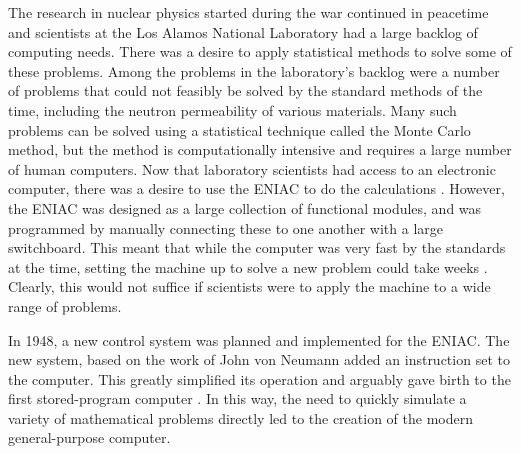 \documentclass[\rootfolder/main.tex]{subfiles}
\begin{document}
The research in nuclear physics started during the war continued in peacetime and scientists at the Los Alamos National Laboratory had a large backlog of computing needs.
There was a desire to apply statistical methods to solve some of these problems.
Among the problems in the laboratory's backlog were a number of problems that could not feasibly be solved by the standard methods of the time, including the neutron permeability of various materials.
Many such problems can be solved using a statistical technique called the Monte Carlo method, but the method is computationally intensive and requires a large number of human computers.
Now that laboratory scientists had access to an electronic computer, there was a desire to use the ENIAC to do the calculations \cite{Haigh2014}.
However, the ENIAC was designed as a large collection of functional modules, and was programmed by manually connecting these to one another with a large switchboard.
This meant that while the computer was very fast by the standards at the time, setting the machine up to solve a new problem could take weeks \cite{Rope2007}.
Clearly, this would not suffice if scientists were to apply the machine to a wide range of problems.

In 1948, a new control system was planned and implemented for the ENIAC.
The new system, based on the work of John von Neumann \cite{VonNeumann1993} \cite{Haigh2014a} added an instruction set to the computer.
This greatly simplified its operation and arguably gave birth to the first stored-program computer \cite{Rope2007}.
In this way, the need to quickly simulate a variety of mathematical problems directly led to the creation of the modern general-purpose computer.
\end{document}
